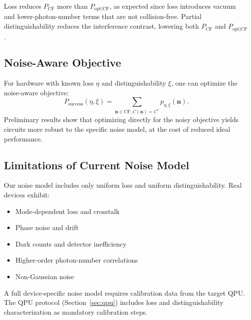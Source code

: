 Loss reduces $P_{\mathrm{CF}}$ more than $P_{\mathrm{opt|CF}}$, as expected since loss introduces vacuum and lower-photon-number terms that are not collision-free. Partial distinguishability reduces the interference contrast, lowering both $P_{\mathrm{CF}}$ and $P_{\mathrm{opt|CF}}$.

\subsection{Noise-Aware Objective}

For hardware with known loss $\eta$ and distinguishability $\xi$, one can optimize the noise-aware objective:
\begin{equation}
P_{\mathrm{success}}(\eta,\xi) = \sum_{\mathbf{n}\in\mathrm{CF}, C(\mathbf{n})=C^*} p_{\eta,\xi}(\mathbf{n}).
\end{equation}
Preliminary results show that optimizing directly for the noisy objective yields circuits more robust to the specific noise model, at the cost of reduced ideal performance.

\subsection{Limitations of Current Noise Model}

Our noise model includes only uniform loss and uniform distinguishability. Real devices exhibit:
\begin{itemize}
\item Mode-dependent loss and crosstalk
\item Phase noise and drift
\item Dark counts and detector inefficiency
\item Higher-order photon-number correlations
\item Non-Gaussian noise
\end{itemize}
A full device-specific noise model requires calibration data from the target QPU. The QPU protocol (Section~\ref{sec:qpu}) includes loss and distinguishability characterization as mandatory calibration steps.

